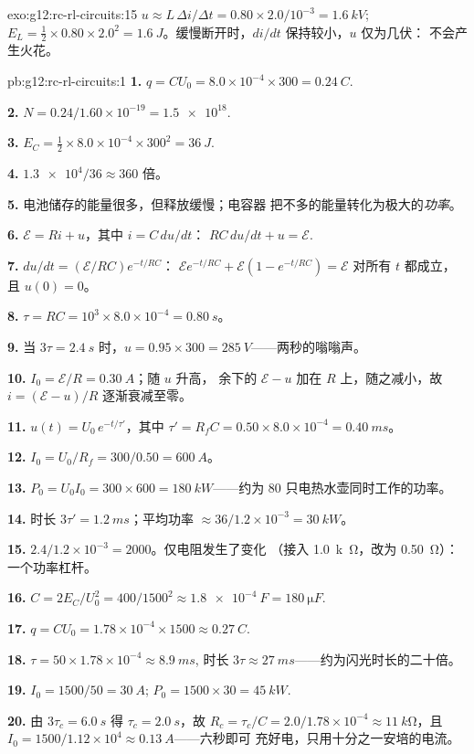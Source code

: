 \begin{solution}{exo:g12:rc-rl-circuits:15}
$u \approx L\,\Delta i/\Delta t = 0.80 \times 2.0/10^{-3} =
\qty{1.6}{kV}$; $E_L = \tfrac12 \times 0.80 \times 2.0^2 =
\qty{1.6}{J}$。缓慢断开时，$di/dt$ 保持较小，$u$ 仅为几伏：
不会产生火花。
\end{solution}

\begin{solution}{pb:g12:rc-rl-circuits:1}
\textbf{1.} $q = CU_0 = 8.0\times10^{-4} \times 300 = \qty{0.24}{C}$.

\textbf{2.} $N = 0.24/1.60\times10^{-19} = \num{1.5e18}$.

\textbf{3.} $E_C = \tfrac12 \times 8.0\times10^{-4} \times 300^2 =
\qty{36}{J}$.

\textbf{4.} $\num{1.3e4}/36 \approx 360$ 倍。

\textbf{5.} 电池储存的能量很多，但释放缓慢；电容器
把不多的能量转化为极大的\emph{功率}。

\textbf{6.} $\mathcal{E} = Ri + u$，其中 $i = C\,du/dt$：
$RC\,du/dt + u = \mathcal{E}$.

\textbf{7.} $du/dt = (\mathcal{E}/RC)e^{-t/RC}$：
$\mathcal{E}e^{-t/RC} + \mathcal{E}(1 - e^{-t/RC}) = \mathcal{E}$
对所有 $t$ 都成立，且 $u(0) = 0$。

\textbf{8.} $\tau = RC = 10^3 \times 8.0\times10^{-4} = \qty{0.80}{s}$。

\textbf{9.} 当 $3\tau = \qty{2.4}{s}$ 时，$u = 0.95 \times 300 =
\qty{285}{V}$——两秒的嗡嗡声。

\textbf{10.} $I_0 = \mathcal{E}/R = \qty{0.30}{A}$；随 $u$ 升高，
余下的 $\mathcal{E} - u$ 加在 $R$ 上，随之减小，故 $i = (\mathcal{E}-u)/R$
逐渐衰减至零。

\textbf{11.} $u(t) = U_0\,e^{-t/\tau'}$，其中 $\tau' = R_f C =
0.50 \times 8.0\times10^{-4} = \qty{0.40}{ms}$。

\textbf{12.} $I_0 = U_0/R_f = 300/0.50 = \qty{600}{A}$。

\textbf{13.} $P_0 = U_0 I_0 = 300 \times 600 = \qty{180}{kW}$——约为
$80$ 只电热水壶同时工作的功率。

\textbf{14.} 时长 $3\tau' = \qty{1.2}{ms}$；平均功率
$\approx 36/1.2\times10^{-3} = \qty{30}{kW}$。

\textbf{15.} $2.4/1.2\times10^{-3} = 2000$。仅电阻发生了变化
（接入 \qty{1.0}{k\ohm}，改为 \qty{0.50}{\ohm}）：一个功率杠杆。

\textbf{16.} $C = 2E_C/U_0^2 = 400/1500^2 \approx \qty{1.8e-4}{F} =
\qty{180}{\micro F}$.

\textbf{17.} $q = CU_0 = 1.78\times10^{-4} \times 1500 \approx
\qty{0.27}{C}$.

\textbf{18.} $\tau = 50 \times 1.78\times10^{-4} \approx \qty{8.9}{ms}$,
时长 $3\tau \approx \qty{27}{ms}$——约为闪光时长的二十倍。

\textbf{19.} $I_0 = 1500/50 = \qty{30}{A}$;
$P_0 = 1500 \times 30 = \qty{45}{kW}$.

\textbf{20.} 由 $3\tau_c = \qty{6.0}{s}$ 得 $\tau_c = \qty{2.0}{s}$，故
$R_c = \tau_c/C = 2.0/1.78\times10^{-4} \approx \qty{11}{k\ohm}$，且
$I_0 = 1500/1.12\times10^{4} \approx \qty{0.13}{A}$——六秒即可
充好电，只用十分之一安培的电流。
\end{solution}
